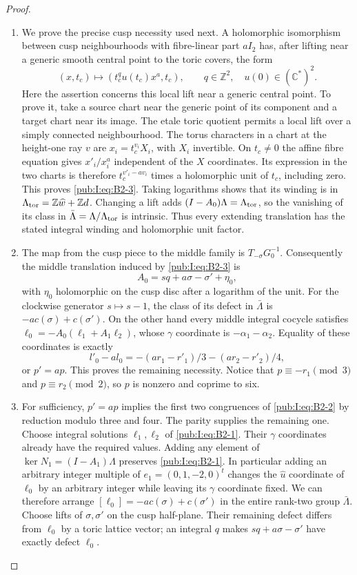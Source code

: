 \begin{proof}
\begin{enumerate}[label=\arabic*.,leftmargin=*]
\item We prove the precise cusp necessity used next. A holomorphic isomorphism between cusp neighbourhoods with fibre-linear part $aI_2$ has, after lifting near a generic smooth central point to the toric covers, the form
\begin{equation}
 (x,t_c)\longmapsto(t_c^q u(t_c)x^a,t_c),\qquad q\in\mathbb Z^2,
 \quad u(0)\in(\mathbb C^*)^2.
\label{pub:I:eq:B2-3}
\end{equation}
Here the assertion concerns this local lift near a generic central point. To prove it, take a source chart near the generic point of its component and a target chart near its image. The etale toric quotient permits a local lift over a simply connected neighbourhood. The torus characters in a chart at the height-one ray $v$ are $x_i=t_c^{v_i}X_i$, with $X_i$ invertible. On $t_c\ne0$ the affine fibre equation gives $x'_i/x_i^a$ independent of the $X$ coordinates. Its expression in the two charts is therefore $t_c^{v'_i-av_i}$ times a holomorphic unit of $t_c$, including zero. This proves \eqref{pub:I:eq:B2-3}. Taking logarithms shows that its winding is in $\Lambda_{\rm tor}=\mathbb Z\widehat w+\mathbb Zd$. Changing a lift adds $(I-A_0)\Lambda=\Lambda_{\rm tor}$, so the vanishing of its class in $\bar\Lambda=\Lambda/\Lambda_{\rm tor}$ is intrinsic. Thus every extending translation has the stated integral winding and holomorphic unit factor.

\item The map from the cusp piece to the middle family is $T_{-\sigma}G_0^{-1}$. Consequently the middle translation induced by \eqref{pub:I:eq:B2-3} is
\[
 A_0=sq+a\sigma-\sigma'+\eta_0,
\]
with $\eta_0$ holomorphic on the cusp disc after a logarithm of the unit. For the clockwise generator $s\mapsto s-1$, the class of its defect in $\bar\Lambda$ is $-a c(\sigma)+c(\sigma')$. On the other hand every middle integral cocycle satisfies
$\ell_0=-A_0(\ell_1+A_1\ell_2)$, whose $\gamma$ coordinate is $-\alpha_1-\alpha_2$. Equality of these coordinates is exactly
\[
 l'_0-a l_0=-(ar_1-r'_1)/3-(ar_2-r'_2)/4,
\]
or $p'=ap$. This proves the remaining necessity. Notice that $p\equiv-r_1\pmod3$ and $p\equiv r_2\pmod2$, so $p$ is nonzero and coprime to six.

\item For sufficiency, $p'=ap$ implies the first two congruences of \eqref{pub:I:eq:B2-2} by reduction modulo three and four. The parity supplies the remaining one. Choose integral solutions $\ell_1,\ell_2$ of \eqref{pub:I:eq:B2-1}. Their $\gamma$ coordinates already have the required values. Adding any element of $\ker N_1=(I-A_1)\Lambda$ preserves \eqref{pub:I:eq:B2-1}. In particular adding an arbitrary integer multiple of $e_1=(0,1,-2,0)^t$ changes the $\widehat u$ coordinate of $\ell_0$ by an arbitrary integer while leaving its $\gamma$ coordinate fixed. We can therefore arrange
$[\ell_0]=-a c(\sigma)+c(\sigma')$ in the entire rank-two group $\bar\Lambda$. Choose lifts of $\sigma,\sigma'$ on the cusp half-plane. Their remaining defect differs from $\ell_0$ by a toric lattice vector; an integral $q$ makes $sq+a\sigma-\sigma'$ have exactly defect $\ell_0$.


\end{enumerate}
\end{proof}
